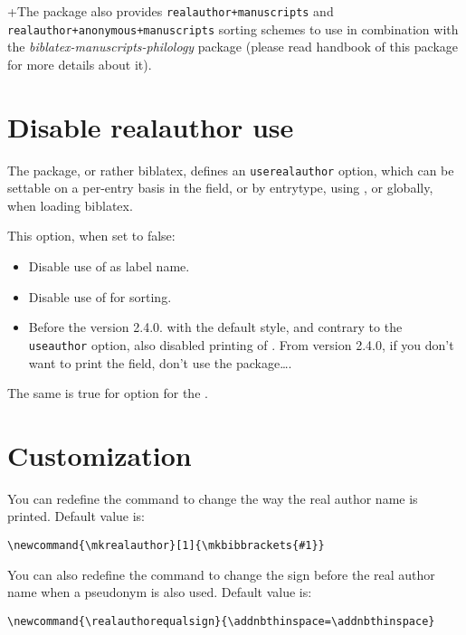 \documentclass{ltxdockit}[2011/03/25]
\newcommand{\biblatex}{biblatex\xspace}
\begin{document}
 
 +The package also provides \verb-realauthor+manuscripts- and  \verb-realauthor+anonymous+manuscripts- sorting schemes to use in combination with the \emph{biblatex-manuscripts-philology} package (please read handbook of this package for more details about it).
 
\section{Disable realauthor use}\label{userealauthor}

The package, or rather \biblatex, defines an \verb+userealauthor+ option, which can be settable on a per-entry basis in the  field, or by entrytype, using , or globally, when loading \biblatex. 

This option, when set to false:
\begin{itemize}
	\item Disable use of  as label name.
	\item Disable use of  for sorting.
	\item Before the version 2.4.0. with the default style, and contrary to the \verb+useauthor+ option, also disabled printing of . From version 2.4.0, if you don't want to print the field, don't use the package\ldots.
\end{itemize}

The same is true for  option for the . 

\section{Customization}

You can redefine the  command to change the way the real author name is printed. Default value is:

\begin{verbatim}
\newcommand{\mkrealauthor}[1]{\mkbibbrackets{#1}}
\end{verbatim}

You can also redefine the  command to change the sign before the real author name when a pseudonym is also used. Default value is:

\begin{verbatim}
\newcommand{\realauthorequalsign}{\addnbthinspace=\addnbthinspace}
\end{verbatim}
\end{document}
